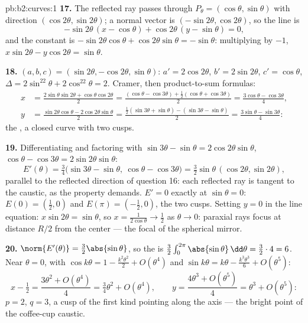 \begin{solution}{pb:b2:curves:1}
\textbf{17.} The reflected ray passes through $P_\theta =
(\cos\theta, \sin\theta)$ with direction $(\cos2\theta,
\sin2\theta)$; a normal vector is $(-\sin2\theta,
\cos2\theta)$, so the line is
\[
-\sin2\theta\,(x - \cos\theta) + \cos2\theta\,(y -
\sin\theta) = 0,
\]
and the constant is $-\sin2\theta\cos\theta +
\cos2\theta\sin\theta = -\sin\theta$: multiplying by $-1$,
$x\sin2\theta - y\cos2\theta = \sin\theta$.

\textbf{18.} $(a, b, c) = (\sin2\theta, -\cos2\theta,
\sin\theta)$: $a' = 2\cos2\theta$, $b' = 2\sin2\theta$, $c' =
\cos\theta$, $\Delta = 2\sin^22\theta + 2\cos^22\theta = 2$.
Cramer, then product-to-sum formulas:
\begin{align*}
x &= \frac{2\sin\theta\sin2\theta +
\cos\theta\cos2\theta}{2}
= \frac{(\cos\theta - \cos3\theta) + \frac12(\cos\theta +
\cos3\theta)}{2} = \frac{3\cos\theta - \cos3\theta}4,\\
y &= \frac{\sin2\theta\cos\theta - 2\cos2\theta\sin\theta}2
= \frac{\frac12(\sin3\theta + \sin\theta) - (\sin3\theta -
\sin\theta)}2 = \frac{3\sin\theta - \sin3\theta}4 :
\end{align*}
the , a closed curve with two cusps.

\textbf{19.} Differentiating and factoring with $\sin3\theta
- \sin\theta = 2\cos2\theta\sin\theta$, $\cos\theta -
\cos3\theta = 2\sin2\theta\sin\theta$:
\[
E'(\theta) = \tfrac34\bigl(\sin3\theta - \sin\theta,\
\cos\theta - \cos3\theta\bigr)
= \tfrac32\sin\theta\,(\cos2\theta, \sin2\theta),
\]
parallel to the reflected direction of question 16: each
reflected ray is tangent to the caustic, as the 
property demands. $E' = 0$ exactly at $\sin\theta = 0$:
$E(0) = (\tfrac12, 0)$ and $E(\pi) = (-\tfrac12, 0)$, the two
cusps. Setting $y = 0$ in the line equation: $x\sin2\theta =
\sin\theta$, so $x = \frac1{2\cos\theta} \to \frac12$ as
$\theta \to 0$: paraxial rays focus at distance $R/2$ from
the center --- the focal  of the spherical mirror.

\textbf{20.} $\norm{E'(\theta)} = \tfrac32\abs{\sin\theta}$,
so the  is $\tfrac32\int_0^{2\pi}\abs{\sin\theta}\,
\dd\theta = \tfrac32\cdot4 = 6$. Near $\theta = 0$, with
$\cos k\theta = 1 - \tfrac{k^2\theta^2}2 + O(\theta^4)$ and
$\sin k\theta = k\theta - \tfrac{k^3\theta^3}6 +
O(\theta^5)$:
\[
x - \tfrac12 = \frac{3\theta^2 + O(\theta^4)}{4}
= \tfrac34\theta^2 + O(\theta^4),
\qquad
y = \frac{4\theta^3 + O(\theta^5)}{4}
= \theta^3 + O(\theta^5) :
\]
$p = 2$, $q = 3$, a cusp of the first kind pointing along the
axis --- the bright point of the coffee-cup caustic.


\end{solution}
